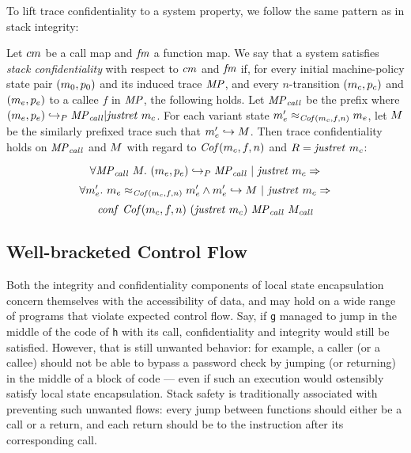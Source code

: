 \documentclass[acmsmall,review,anonymous]{acmart}\settopmatter{printfolios=true,printccs=false,printacmref=false}
\begin{document}
To lift trace confidentiality to a system property, we follow the same
pattern as in stack integrity:

Let $cm$ be a call map and $\mathit{fm}$ a function map. We say that a
system satisfies {\em stack confidentiality} with respect to
$cm$ and $\mathit{fm}$ if, for every initial machine-policy state
pair $(m_0, p_0)$ and its induced trace $\mathit{MP}$, and every
$n$-transition $(m_c, p_c)$ and $(m_e, p_e)$ to a callee
$f$ in $\mathit{MP}$, the following holds. Let $\mathit{MP}_{\mathit{call}}$ be the prefix where
\((m_e,p_e) \hookrightarrow_P \mathit{MP}_{\mathit{call}} | \mathit{justret}\ m_c\).
For each variant state \(m_e' \approx_{\mathit{Cof}(m_c, f, n)}
m_e\), let \(M\) be the similarly prefixed trace such that
\(m_e' \hookrightarrow M\). Then trace confidentiality holds on
\(\mathit{MP}_{\mathit{call}}\) and \(M\) with regard to \(\mathit{Cof}(m_c, f, n)\)
and \(R = \mathit{justret}\ m_c\):

$$\forall \mathit{MP}_{\mathit{call}} ~ M. ~
(m_e,p_e) \hookrightarrow_P \mathit{MP}_{\mathit{call}} ~ | ~ \mathit{justret}\ m_c \Rightarrow$$
$$\forall m_e'. ~ m_e \approx_{\mathit{Cof}(m_c, f, n)} m_e' \wedge
m_e' \hookrightarrow M ~ | ~ \mathit{justret}\ m_c \Rightarrow$$
$$\mathit{conf}~\mathit{Cof}(m_c, f, n) ~ (\mathit{justret}\ m_c) ~ \mathit{MP}_{\mathit{call}} ~ M_{\mathit{call}}$$

\subsection{Well-bracketed Control Flow}
\label{sec:wbcf}

Both the integrity and confidentiality components of local state
encapsulation concern themselves with the accessibility of data, and
may hold on a wide range of programs that violate expected control
flow. Say, if {\tt g} managed to jump in the middle of the
code of {\tt h} with its call, confidentiality and integrity would
still be satisfied.
%
However, that is still unwanted behavior: for example, a caller (or a
callee) should not be able to bypass a password check by jumping (or
returning) in the middle of a block of code --- even if such an execution
would ostensibly satisfy local state encapsulation.
%
Stack safety is traditionally associated with preventing such unwanted
flows: every jump between functions should either be a call or a
return, and each return should be to the instruction after its
corresponding call.
\end{document}
